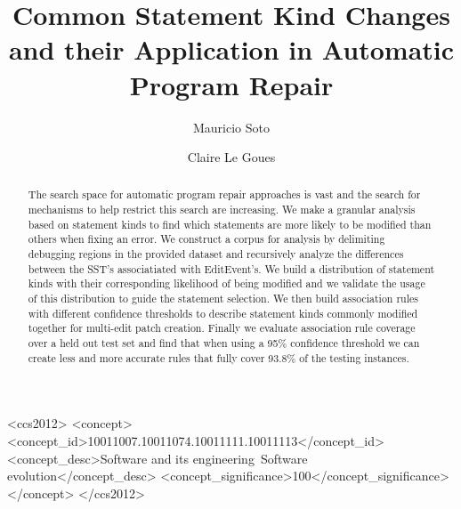 \documentclass[sigconf]{acmart}
\begin{document}
\title{Common Statement Kind Changes and their Application in Automatic Program Repair}


\author{Mauricio Soto}

\author{Claire Le Goues}




\begin{abstract}
The search space for automatic program repair approaches 
is vast and the search for mechanisms to help restrict this 
search are increasing.
We make a granular analysis based on statement kinds
to find which statements are more likely to be modified than others
when fixing an error.
We construct a corpus for analysis by 
delimiting debugging regions in the provided dataset and 
recursively analyze the
differences between the SST's associatiated with EditEvent's. 
We build a distribution of statement kinds with their corresponding
likelihood of being modified and we validate the usage of this 
distribution to guide the statement selection.
We then build association rules with different
confidence thresholds to describe statement kinds commonly modified
together for multi-edit patch creation. Finally
we evaluate association rule coverage over a held out test set
and find that when using a 95\% confidence threshold we
can create less and more accurate rules that fully cover 93.8\% of the testing instances.

\end{abstract}

%
%
\begin{CCSXML}
<ccs2012>
<concept>
<concept_id>10011007.10011074.10011111.10011113</concept_id>
<concept_desc>Software and its engineering~Software evolution</concept_desc>
<concept_significance>100</concept_significance>
</concept>
</ccs2012>
\end{CCSXML}
\end{document}
